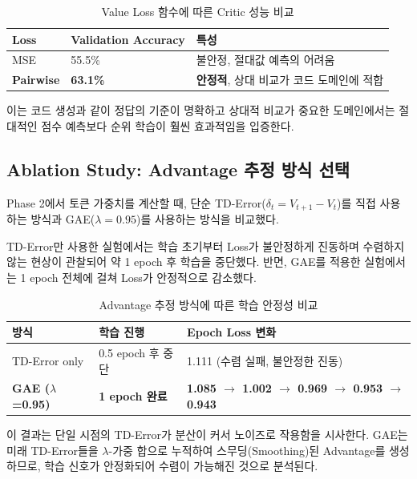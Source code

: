 \documentclass[11pt,a4paper]{article}
\begin{document}
\begin{table}[h]
\centering
\caption{Value Loss 함수에 따른 Critic 성능 비교}
\label{tab:ablation_loss}
\begin{tabular}{@{}p{3cm}p{4cm}p{7cm}@{}}
\toprule
\textbf{Loss} & \textbf{Validation Accuracy} & \textbf{특성} \\
\midrule
MSE & 55.5\% & 불안정, 절대값 예측의 어려움 \\
\textbf{Pairwise} & \textbf{63.1\%} & \textbf{안정적}, 상대 비교가 코드 도메인에 적합 \\
\bottomrule
\end{tabular}
\end{table}

이는 코드 생성과 같이 정답의 기준이 명확하고 상대적 비교가 중요한 도메인에서는 절대적인 점수 예측보다 순위 학습이 훨씬 효과적임을 입증한다.

\subsection{Ablation Study: Advantage 추정 방식 선택}

Phase 2에서 토큰 가중치를 계산할 때, 단순 TD-Error($\delta_t = V_{t+1} - V_t$)를 직접 사용하는 방식과 GAE($\lambda=0.95$)를 사용하는 방식을 비교했다.

TD-Error만 사용한 실험에서는 학습 초기부터 Loss가 불안정하게 진동하며 수렴하지 않는 현상이 관찰되어 약 1 epoch 후 학습을 중단했다. 반면, GAE를 적용한 실험에서는 1 epoch 전체에 걸쳐 Loss가 안정적으로 감소했다.

\begin{table}[h]
\centering
\caption{Advantage 추정 방식에 따른 학습 안정성 비교}
\label{tab:ablation_advantage}
\begin{tabular}{@{}p{3.5cm}p{3cm}p{7.5cm}@{}}
\toprule
\textbf{방식} & \textbf{학습 진행} & \textbf{Epoch Loss 변화} \\
\midrule
TD-Error only & 0.5 epoch 후 중단 & 1.111 (수렴 실패, 불안정한 진동) \\
\textbf{GAE ($\lambda$=0.95)} & \textbf{1 epoch 완료} & \textbf{1.085 $\rightarrow$ 1.002 $\rightarrow$ 0.969 $\rightarrow$ 0.953 $\rightarrow$ 0.943} \\
\bottomrule
\end{tabular}
\end{table}

이 결과는 단일 시점의 TD-Error가 분산이 커서 노이즈로 작용함을 시사한다. GAE는 미래 TD-Error들을 $\lambda$-가중 합으로 누적하여 스무딩(Smoothing)된 Advantage를 생성하므로, 학습 신호가 안정화되어 수렴이 가능해진 것으로 분석된다.
\end{document}

